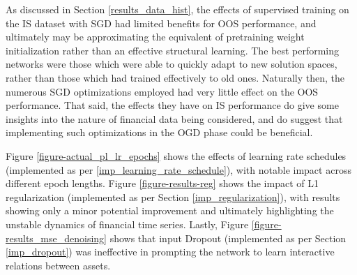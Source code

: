 \documentclass[a4paper,11pt,oneside]{article}
\theoremstyle{plain}
\theoremstyle{definition}
\begin{document}
	As discussed in Section \ref{results_data_hist}, the effects of supervised training on the IS dataset with SGD had limited benefits for OOS performance, and ultimately may be approximating the equivalent of pretraining weight initialization rather than an effective structural learning. The best performing networks were those which were able to quickly adapt to new solution spaces, rather than those which had trained effectively to old ones. Naturally then, the numerous SGD optimizations employed had very little effect on the OOS performance. That said, the effects they have on IS performance do give some insights into the nature of financial data being considered, and do suggest that implementing such optimizations in the OGD phase could be beneficial. \newline
		
	Figure \ref{figure-actual_pl_lr_epochs} shows the effects of learning rate schedules (implemented as per  \ref{imp_learning_rate_schedule}), with notable impact across different epoch lengths. Figure \ref{figure-results-reg} shows the impact of L1 regularization (implemented as per Section \ref{imp_regularization}), with results showing only a minor potential improvement and ultimately highlighting the unstable dynamics of financial time series. Lastly, Figure \ref{figure-results_mse_denoising} shows that input Dropout (implemented as per Section \ref{imp_dropout}) was ineffective in prompting the network to learn interactive relations between assets.
		
\end{document}
